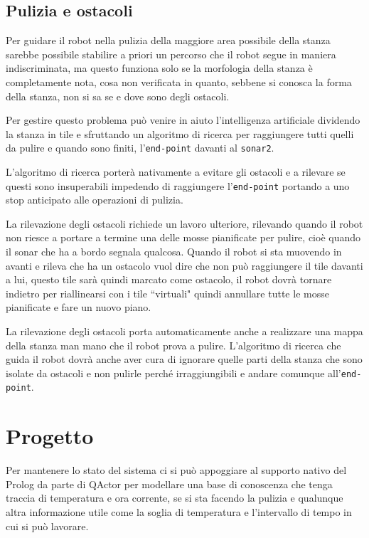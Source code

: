 \subsection{Pulizia e ostacoli}
Per guidare il robot nella pulizia della maggiore area possibile della stanza sarebbe possibile stabilire a priori un percorso che il robot segue in maniera indiscriminata, ma questo funziona solo se la morfologia della stanza è completamente nota, cosa non verificata in quanto, sebbene si conosca la forma della stanza, non si sa se e dove sono degli ostacoli.

Per gestire questo problema può venire in aiuto l'intelligenza artificiale dividendo la stanza in tile e sfruttando un algoritmo di ricerca per raggiungere tutti quelli da pulire e quando sono finiti, l'\texttt{end-point} davanti al \texttt{sonar2}.

L'algoritmo di ricerca porterà nativamente a evitare gli ostacoli e a rilevare se questi sono insuperabili impedendo di raggiungere l'\texttt{end-point} portando a uno stop anticipato alle operazioni di pulizia.

La rilevazione degli ostacoli richiede un lavoro ulteriore, rilevando quando il robot non riesce a portare a termine una delle mosse pianificate per pulire, cioè quando il sonar che ha a bordo segnala qualcosa. Quando il robot si sta muovendo in avanti e rileva che ha un ostacolo vuol dire che non può raggiungere il tile davanti a lui, questo tile sarà quindi marcato come ostacolo, il robot dovrà tornare indietro per riallinearsi con i tile ``virtuali" quindi annullare tutte le mosse pianificate e fare un nuovo piano. 

La rilevazione degli ostacoli porta automaticamente anche a realizzare una mappa della stanza man mano che il robot prova a pulire. L'algoritmo di ricerca che guida il robot dovrà anche aver cura di ignorare quelle parti della stanza che sono isolate da ostacoli e non pulirle perché irraggiungibili e andare comunque all'\texttt{end-point}.

\section{Progetto}
Per mantenere lo stato del sistema ci si può appoggiare al supporto nativo del Prolog da parte di QActor per modellare una base di conoscenza che tenga traccia di temperatura e ora corrente, se si sta facendo la pulizia e qualunque altra informazione utile come la soglia di temperatura e l'intervallo di tempo in cui si può lavorare.

